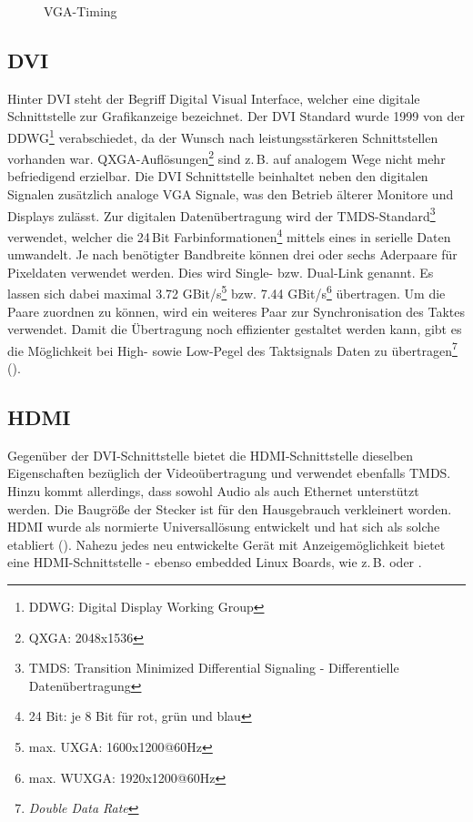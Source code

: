 \begin{figure}[htp]
	\centering
{}
	\caption{VGA-Timing}
	\label{fig:vga_timing}
\end{figure}

\subsection{DVI}
Hinter DVI steht der Begriff Digital Visual Interface, welcher eine digitale Schnittstelle zur Grafikanzeige bezeichnet. Der DVI Standard wurde 1999 von der DDWG\footnote{DDWG: Digital Display Working Group} verabschiedet, da der Wunsch nach leistungsstärkeren Schnittstellen vorhanden war. QXGA-Auflösungen\footnote{QXGA: 2048x1536} sind z.\,B. auf analogem Wege nicht mehr befriedigend erzielbar. Die DVI Schnittstelle beinhaltet neben den digitalen Signalen zusätzlich analoge VGA Signale, was den Betrieb älterer Monitore und Displays zulässt. Zur digitalen Datenübertragung wird der TMDS-Standard\footnote{TMDS: Transition Minimized Differential Signaling - Differentielle Datenübertragung} verwendet, welcher die 24\,Bit Farbinformationen\footnote{24 Bit: je 8 Bit für rot, grün und blau} mittels eines  in serielle Daten umwandelt. Je nach benötigter Bandbreite können drei oder sechs Aderpaare für Pixeldaten verwendet werden. Dies wird Single- bzw. Dual-Link genannt. Es lassen sich dabei maximal 3.72 GBit/s\footnote{max. UXGA: 1600x1200@60Hz} bzw. 7.44 GBit/s\footnote{max. WUXGA: 1920x1200@60Hz} übertragen. Um die Paare zuordnen zu können, wird ein weiteres Paar zur Synchronisation des Taktes verwendet. Damit die Übertragung noch effizienter gestaltet werden kann, gibt es die Möglichkeit bei High- sowie Low-Pegel des Taktsignals Daten zu übertragen\footnote{\textit{Double Data Rate}} (\cite{Leunig2002}).

\subsection{HDMI}
Gegenüber der DVI-Schnittstelle bietet die HDMI-Schnittstelle dieselben Eigenschaften bezüglich der Videoübertragung und verwendet ebenfalls TMDS. Hinzu kommt allerdings, dass sowohl Audio als auch Ethernet unterstützt werden. Die Baugröße der Stecker ist für den Hausgebrauch verkleinert worden. HDMI wurde als normierte Universallösung entwickelt und hat sich als solche etabliert (\cite{Extron2014}). Nahezu jedes neu entwickelte Gerät mit Anzeigemöglichkeit bietet eine HDMI-Schnittstelle - ebenso embedded Linux Boards, wie z.\,B.  oder .


